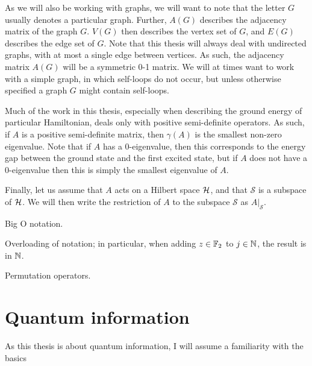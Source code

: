 \documentclass[../thesis-main/thesis-main]{subfiles}
\begin{document}
As we will also be working with graphs, we will want to note that the letter $G$ usually denotes a particular graph.  Further, $A(G)$ describes the adjacency matrix of the graph $G$.  $V(G)$ then describes the vertex set of $G$, and $E(G)$ describes the edge set of $G$.  Note that this thesis will always deal with undirected graphs, with at most a single edge between vertices.  As such, the adjacency matrix $A(G)$ will be a symmetric 0-1 matrix.  We will at times want to work with a simple graph, in which self-loops do not occur, but unless otherwise specified a graph $G$ might contain self-loops.


Much of the work in this thesis, especially when describing the ground energy of particular Hamiltonian, deals only with positive semi-definite operators.  As such, if $A$ is a positive semi-definite matrix, then $\gamma(A)$ is the smallest non-zero eigenvalue.   Note that if $A$ has a 0-eigenvalue, then this corresponds to the energy gap between the ground state and the first excited state, but if $A$ does not have a 0-eigenvalue then this is simply the smallest eigenvalue of $A$.

Finally, let us assume that $A$ acts on a Hilbert space $\mathcal{H}$, and that $\mathcal{S}$ is a subspace of $\mathcal{H}$.  We will then write the restriction of $A$ to the subspace $\mathcal{S}$ as $A\big|_\mathcal{S}$. 

Big O notation.

Overloading of notation; in particular, when adding $z\in \mathbb{F}_2$ to $j\in \mathbb{N}$, the result is in $\mathbb{N}$.

Permutation operators.

\section{Quantum information}
\label{sec:quantum_information}

As this thesis is about quantum information, I will assume a familiarity with the basics 
\end{document}
